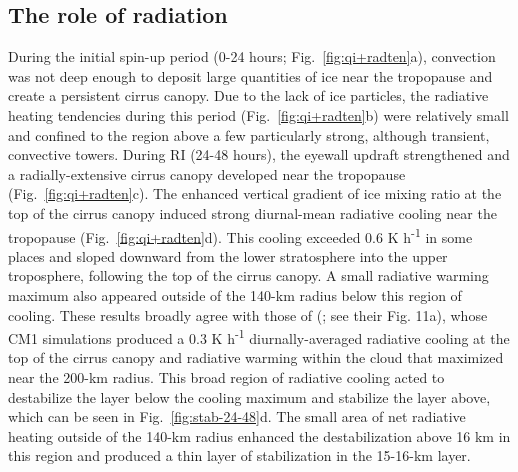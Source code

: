 \documentclass{ametsoc}
\begin{document}
  \subsection{The role of radiation}
During the initial spin-up period (0-24 hours; Fig.~\ref{fig:qi+radten}a), convection was not deep enough to deposit large quantities of ice near the tropopause and create a persistent cirrus canopy.
Due to the lack of ice particles, the radiative heating tendencies during this period (Fig.~\ref{fig:qi+radten}b) were relatively small and confined to the region above a few particularly strong, although transient, convective towers.
During RI (24-48 hours), the eyewall updraft strengthened and a radially-extensive cirrus canopy developed near the tropopause (Fig.~\ref{fig:qi+radten}c).
The enhanced vertical gradient of ice mixing ratio at the top of the cirrus canopy induced strong diurnal-mean radiative cooling near the tropopause (Fig.~\ref{fig:qi+radten}d).
This cooling exceeded 0.6 K h\textsuperscript{-1} in some places and sloped downward from the lower stratosphere into the upper troposphere, following the top of the cirrus canopy.
A small radiative warming maximum also appeared outside of the 140-km radius below this region of cooling.
These results broadly agree with those of \citeauthor{buetal} (\citeyear{buetal}; see their Fig. 11a), whose CM1 simulations produced a 0.3 K h\textsuperscript{-1} diurnally-averaged radiative cooling at the top of the cirrus canopy and radiative warming within the cloud that maximized near the 200-km radius.
This broad region of radiative cooling acted to destabilize the layer below the cooling maximum and stabilize the layer above, which can be seen in Fig.~\ref{fig:stab-24-48}d.
The small area of net radiative heating outside of the 140-km radius enhanced the destabilization above 16 km in this region and produced a thin layer of stabilization in the 15-16-km layer.
\end{document}
